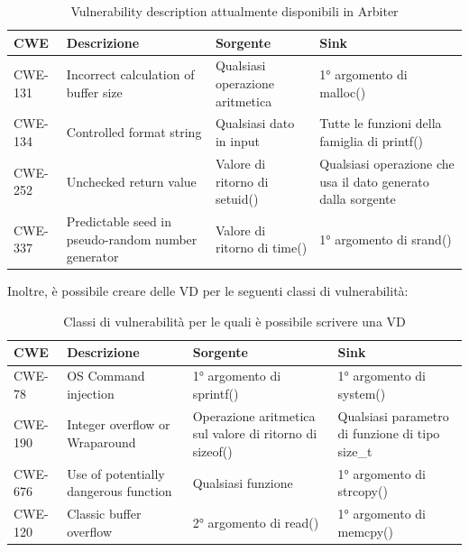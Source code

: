 \documentclass[../main.tex]{subfiles}
\begin{document}
\begin{table}[H]
\centering
\begin{tabularx}{\textwidth}{|l|X|X|X|}
\hline
CWE     & Descrizione                                        & Sorgente                        & Sink                                                                                                   \\ \hline
CWE-131 & Incorrect calculation of buffer size               & Qualsiasi operazione aritmetica & 1° argomento di malloc()                                                                               \\ \hline
CWE-134 & Controlled format string                           & Qualsiasi dato in input         & Tutte le funzioni della famiglia di printf()                                                           \\ \hline
CWE-252 & Unchecked return value                             & Valore di ritorno di setuid()   & Qualsiasi operazione che usa il dato generato dalla sorgente                                           \\ \hline
CWE-337 & Predictable seed in pseudo-random number generator & Valore di ritorno di time()     & 1° argomento di srand()                                                                                \\ \hline
\end{tabularx}
\caption{Vulnerability description attualmente disponibili in Arbiter}
\end{table}
\noindent
Inoltre, è possibile creare delle VD per le seguenti classi di vulnerabilità:
\begin{table}[H]
\centering
\begin{tabularx}{\textwidth}{|l|X|X|X|}
\hline
CWE     & Descrizione                                        & Sorgente                        & Sink                                                                                                   \\ \hline
CWE-78 & OS Command injection& 1° argomento di sprintf() & 1° argomento di system()                                                                               \\ \hline
CWE-190 & Integer overflow or Wraparound                           & Operazione aritmetica sul valore di ritorno di sizeof()         & Qualsiasi parametro di funzione di tipo size\_t                                                           \\ \hline
CWE-676 & Use of potentially dangerous function                             & Qualsiasi funzione   & 1° argomento di strcopy()                              \\ \hline
CWE-120 & Classic buffer overflow     & 2° argomento di read() & 1° argomento di memcpy()                                                                                \\ \hline
\end{tabularx}
\caption{Classi di vulnerabilità per le quali è possibile scrivere una VD}
\end{table}
\end{document}
